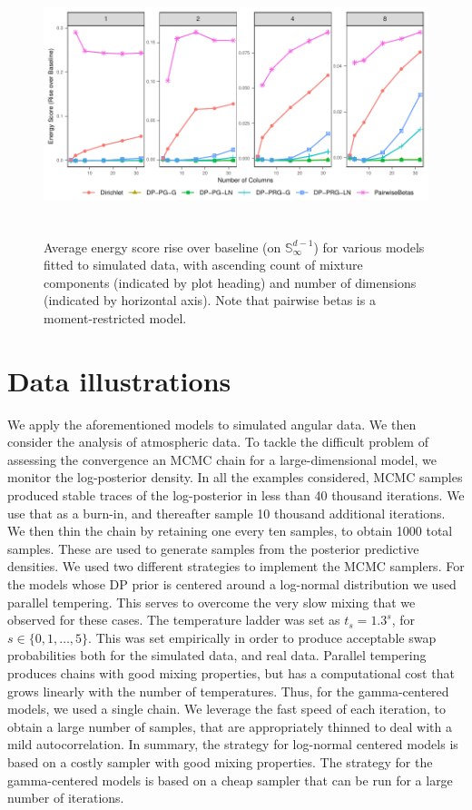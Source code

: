 
\begin{figure}[htb]
    \centering
    \caption{Average energy score rise over baseline (on $\mathbb{S}_{\infty}^{d-1}$) for various 
    models fitted to simulated data, with ascending count of mixture components (indicated by plot
    heading) and number of dimensions (indicated by horizontal axis).  Note that pairwise betas is
    a moment-restricted model.\label{fig:simpples}}
    \includegraphics[height=3in, width = \textwidth]{./images/sim_es_rise}
\end{figure}

\section{Data illustrations\label{sec:results}} 
We apply the aforementioned models to simulated angular data. We then consider the analysis
    of atmospheric data. To tackle the difficult problem of assessing the convergence 
    an MCMC chain for a large-dimensional model, we monitor the log-posterior 
    density. In all the examples considered, MCMC samples produced stable traces of the
    log-posterior in less than 40 thousand  iterations. We use that as a burn-in, 
    and thereafter sample 10 thousand additional iterations. We then thin the chain by retaining one
    every ten samples, to obtain 1000 total samples. These are used to generate samples from the 
    posterior predictive densities. We used two different strategies to implement the MCMC samplers.
    For the models whose DP prior is centered around a log-normal distribution we used parallel 
    tempering. This serves to overcome the very slow mixing that we observed for these cases.
    The temperature ladder was set as $t_s = 1.3^{s}$,  for $s \in \lbrace0,1,\ldots,5\rbrace$. This was 
    set empirically in order to produce acceptable swap probabilities both for the simulated data, 
    and real data. Parallel tempering produces chains with good mixing properties, but has a 
    computational cost that  grows linearly with the number of temperatures. Thus, for the 
    gamma-centered models, we used a single chain. We leverage the fast speed of each iteration, 
    to obtain a large number of samples, that are appropriately thinned to deal with a mild
    autocorrelation. In summary, the strategy for log-normal centered models is based on a costly
    sampler with good mixing properties. The strategy for the gamma-centered models is based on
    a cheap sampler that can be run for a large number of iterations.

